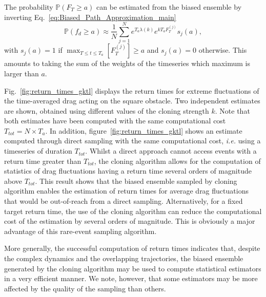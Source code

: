 \documentclass{jfm}
\begin{document}
The probability $\mathbb{P}(F_T \geq a)$ can be estimated from the biased ensemble by inverting Eq.~\eqref{eq:Biased_Path_Approximation_main}
\begin{equation}
  \mathbb{P}(f_d \geq a) \approx \frac{1}{N}\sum_{j=1}^{N}e^{T_a \lambda(k)}e^{kT_aF_T^{(j)}}s_j(a),
\end{equation}
with $s_j(a) = 1$ if $\max_{T\leq t \leq T_a}[F_T^{(j)}] \geq a$ and $s_j(a) = 0$ otherwise. This amounts to taking the sum of the weights of the timeseries which maximum is larger than $a$.

Fig.~\ref{fig:return_times_gktl} displays the return times for extreme fluctuations of the time-averaged drag acting on the square obstacle.
Two independent estimates are shown, obtained using different values of the cloning strength $k$.
Note that both estimates have been computed with the same computational cost $T_{tot}=N\times T_a$.
In addition, figure~\ref{fig:return_times_gktl} shows an estimate computed through direct sampling with the same computational cost, \textit{i.e.} using a timeseries of duration $T_{tot}$.
Whilst a direct approach cannot access events with a return time greater than $T_{tot}$, the cloning algorithm allows for the computation of statistics of drag fluctuations having a return time several orders of magnitude above $T_{tot}$.
This result shows that the biased ensemble sampled by cloning algorithm enables the estimation of return times for average drag fluctuations that would be out-of-reach from a direct sampling.
Alternatively, for a fixed target return time, the use of the cloning algorithm can reduce the computational cost of the estimation by several orders of magnitude.
This is obviously a major advantage of this rare-event sampling algorithm.

More generally, the successful computation of return times indicates that, despite the complex dynamics and the overlapping trajectories, the biased ensemble generated by the cloning algorithm may be used to compute statistical estimators in a very efficient manner.
We note, however, that some estimators may be more affected by the quality of the sampling than others.
\end{document}
